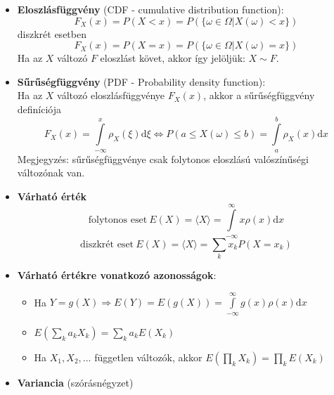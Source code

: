 \documentclass[12pt]{article}
\theoremstyle{plain}
\newcommand{\dd}{\textrm{d}}
\begin{document}
\begin{itemize}
\begin{itemize}
        \end{itemize}
    \item \textbf{Eloszlásfüggvény} (CDF - cumulative distribution function):
        \begin{equation*}
            F_X(x) = P(X<x) = P(\{\omega\in\Omega | X(\omega)<x \})
        \end{equation*}
        diszkrét esetben 
        \begin{equation*}
            F_X(x) = P(X=x) = P(\{\omega\in\Omega | X(\omega)=x \})
        \end{equation*}
        Ha az $X$ változó $F$ eloszlást követ, akkor így jelöljük: $X\sim F$.
    \item \textbf{Sűrűségfüggvény} (PDF - Probability density function):\\
    Ha az $X$ változó eloszlásfüggvénye $F_X(x)$, akkor a sűrűségfüggvény definíciója
        \begin{equation*}
            F_X(x) = \int\limits_{-\infty}^{x}\rho_X(\xi)\dd \xi \Longleftrightarrow P(a \leq X(\omega) \leq b) = \int\limits_{a}^{b}\rho_X(x)\dd x
        \end{equation*}
        Megjegyzés: sűrűségfüggvénye csak folytonos eloszlású valószínűségi változónak van.
    \item \textbf{Várható érték}
    \begin{equation*}
        \text{folytonos eset}~E(X) = \langle X \rangle = \int\limits_{-\infty}^{\infty}x\rho(x) \dd x 
    \end{equation*}
    \begin{equation*}
        \text{diszkrét eset}~E(X) = \langle X \rangle = \sum\limits_{k} x_k P(X=x_k)
    \end{equation*}
    \item \textbf{Várható értékre vonatkozó azonosságok}:
        \begin{itemize}
            \item Ha $Y=g(X) \Rightarrow E(Y) = E(g(X)) = {\displaystyle\int\limits_{-\infty}^{\infty}g(x)\rho(x) \dd x}$  
            \item ${\displaystyle E\left(\sum\limits_k a_k X_k\right) = \sum\limits_k a_k E(X_k)}$
            \item Ha $X_1, X_2, ...$ független változók, akkor ${\displaystyle E\left(\prod\limits_k X_k\right) = \prod\limits_k E(X_k)}$
        \end{itemize}
    \item \textbf{Variancia} (szórásnégyzet)\\

\end{itemize}
\end{document}
